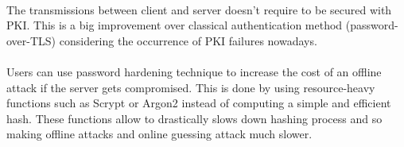 \documentclass[../report.tex]{subfiles}
\begin{document}
\paragraph{}
The transmissions between client and server doesn't require to be secured with PKI. This is a big improvement over classical authentication method (password-over-TLS) considering the occurrence of PKI failures nowadays. %

\paragraph{}
Users can use password hardening technique to increase the cost of an offline attack if the server gets compromised. This is done by using resource-heavy functions such as Scrypt \cite{Scrypt_Paper} or Argon2 \cite{Argon2_Paper} instead of computing a simple and efficient hash. These functions allow to drastically slows down hashing process and so making offline attacks and online guessing attack much slower.

\paragraph{}

\paragraph{}
\end{document}
